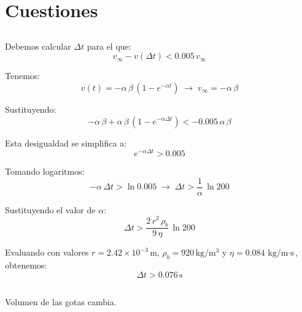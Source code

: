 \section{Cuestiones}

\subsection{}

Debemos calcular $\Delta t$ para el que:
\begin{equation*}
    v_{\infty} - v(\Delta t) < 0.005 \, v_{\infty}
\end{equation*}

Tenemos:
\begin{equation*}
    v(t) = - \alpha\, \beta \, (1 - e^{-\alpha t}) \; \rightarrow \; v_{\infty} = - \alpha\, \beta
\end{equation*}

Sustituyendo:
\begin{equation*}
    - \alpha\, \beta  + \alpha\, \beta \, (1 - e^{-\alpha \Delta t}) < - 0.005\, \alpha \, \beta
\end{equation*}

Esta desigualdad se simplifica a:
\begin{equation*}
    e^{-\alpha \Delta t} > 0.005
\end{equation*}

Tomando logaritmos:
\begin{equation*}
    -\alpha \, \Delta t > \ln{0.005} \; \rightarrow \; \Delta t > \frac{1}{\alpha} \, \ln{200}
\end{equation*}

Sustituyendo el valor de $\alpha$:
\begin{equation*}
    \Delta t > \frac{2 \, r^2 \, \rho_b}{9\, \eta} \, \ln{200}
\end{equation*}

Evaluando con valores $r = 2.42\times 10^{-3}\,$m, $\rho_b = 920\, \text{kg/m$^3$}$ y $\eta = 0.084\,\text{kg/m$\cdot$s}$,
obtenemos:
\begin{equation*}
    \Delta t > 0.076\,\text{s}
\end{equation*}

\subsection{}

\subsection{}

\subsection{}

\subsection{}

Volumen de las gotas cambia.